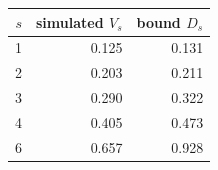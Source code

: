 \begin{tabular}{@{}rrr@{}}
\toprule
$s$ & simulated $V_s$ & bound $D_s$ \\
\midrule
1 & 0.125 & 0.131 \\
2 & 0.203 & 0.211 \\
3 & 0.290 & 0.322 \\
4 & 0.405 & 0.473 \\
6 & 0.657 & 0.928 \\
\bottomrule
\end{tabular}
